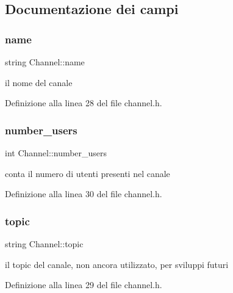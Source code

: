 \subsection{Documentazione dei campi}
\mbox{\label{structChannel_ada27be4a604630621c5de998c7f4a418}} 
\subsubsection{\texorpdfstring{name}{name}}
{\footnotesize\ttfamily string Channel\+::name}



il nome del canale 



Definizione alla linea 28 del file channel.\+h.

\mbox{\label{structChannel_a9dbe5af669a270a0fd46c89c65c235c3}} 
\subsubsection{\texorpdfstring{number\+\_\+users}{number\_users}}
{\footnotesize\ttfamily int Channel\+::number\+\_\+users}



conta il numero di utenti presenti nel canale 



Definizione alla linea 30 del file channel.\+h.

\mbox{\label{structChannel_af6f2434547b280ffbead9234e9826a74}} 
\subsubsection{\texorpdfstring{topic}{topic}}
{\footnotesize\ttfamily string Channel\+::topic}



il topic del canale, non ancora utilizzato, per sviluppi futuri 



Definizione alla linea 29 del file channel.\+h.

\mbox{\label{structChannel_a69e65fd40834071da14e9bdb58cb538f}} 

